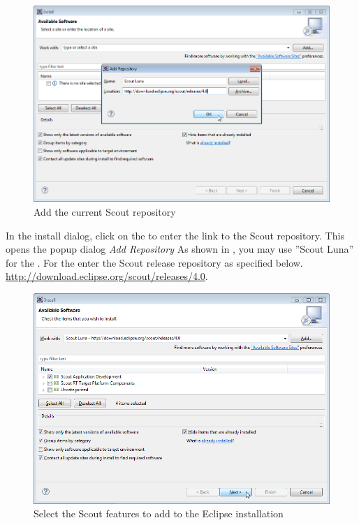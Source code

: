 \documentclass[a4paper,10pt,twoside]{book}
\begin{document}
\begin{figure}
\includegraphics[width=13cm]{eclipse_add_repository.png}
\caption{Add the current Scout repository}
\end{figure}

In the install dialog, click on the  to enter the link to the Scout repository.
This opens the popup dialog \textit{Add Repository}
As shown in , you may use ''Scout Luna'' for the .
For the  enter the Scout release repository as specified below.
\url{http://download.eclipse.org/scout/releases/4.0}.

\begin{figure}
\includegraphics[width=13cm]{eclipse_select_scout_features.png}
\caption{Select the Scout features to add to the Eclipse installation}
\end{figure}
\end{document}
